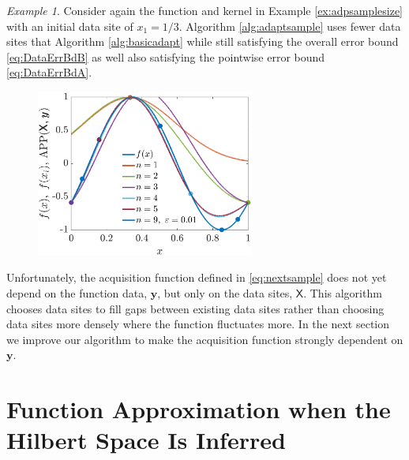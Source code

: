 \documentclass[]{mcom-l}
\theoremstyle{theorem}
\theoremstyle{remark}
\newtheorem{example}{Example}
\newcommand{\mX}{\mathsf{X}}
\newcommand{\by}{{\boldsymbol{y}}}
\begin{document}
\begin{example}
\label{ex:adpdataselect}
Consider again the function and kernel in Example \ref{ex:adpsamplesize} with an initial data site of $x_1=1/3$.
Algorithm \ref{alg:adaptsample} uses fewer data sites that Algorithm \ref{alg:basicadapt} while still satisfying the overall error bound \eqref{eq:DataErrBdB} as well also satisfying the pointwise error bound \eqref{eq:DataErrBdA}.
	

	
	
	\begin{figure}[H]
		\centering
		\includegraphics[height = 5.5cm]{ProgramsImages/AdaptAlgo2_sinFun_GaussKernel_adapt_th_EmpBayesAx_theta_1.eps}
		\caption{ \label{fig:ex2}}
	\end{figure}
	
\end{example}


Unfortunately, the acquisition function defined in \eqref{eq:nextsample} does not yet depend on the function data, $\by$, but only on the data sites, $\mX$.  This algorithm chooses data sites to fill gaps between existing data sites rather than choosing data sites more densely where the function fluctuates more.  In the next section we improve our algorithm to make the acquisition function strongly dependent on $\by$.





\section{Function Approximation when the Hilbert Space Is Inferred} \label{sec:adaptF}
\end{document}
